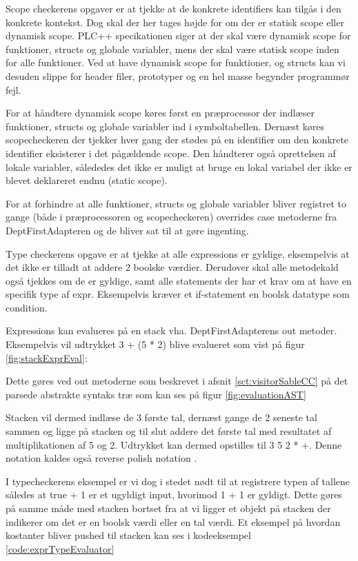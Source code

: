 Scope checkerens opgaver er at tjekke at de konkrete identifiers kan tilgås i den konkrete kontekst. Dog skal der her tages højde for om der er statisk scope eller dynamisk scope. PLC++ specikationen siger at der skal være dynamisk scope for funktioner, structs og globale variabler, mens der skal være statisk scope inden for alle funktioner. Ved at have dynamisk scope for funktioner, og structs kan vi desuden slippe for header filer, prototyper og en hel masse begynder programmør fejl.

For at håndtere dynamisk scope køres først en præprocessor der indlæser funktioner, structs og globale variabler ind i symboltabellen. Dernæst køres scopecheckeren der tjekker hver gang der stødes på en identifier om den konkrete identifier eksisterer i det pågældende scope. Den håndterer også oprettelsen af lokale variabler, sålededes det ikke er muligt at bruge en lokal variabel der ikke er blevet deklareret endnu (static scope).

For at forhindre at alle funktioner, structs og globale variabler bliver registret to gange (både i præprocessoren og scopecheckeren) overrides case metoderne fra DeptFirstAdapteren og de bliver sat til at gøre ingenting.

Type checkerens opgave er at tjekke at alle expressions er gyldige, eksempelvis at det ikke er tilladt at addere 2 boolske værdier. Derudover skal alle metodekald også tjekkes om de er gyldige, samt alle statements der har et krav om at have en specifik type af expr. Eksempelvis kræver et if-statement en boolsk datatype som condition.

Expressions kan evalueres på en stack vha. DeptFirstAdapterens out metoder. Eksempelvis vil udtrykket 3 + (5 * 2) blive evalueret som vist på figur \ref{fig:stackExprEval}:


Dette gøres ved out metoderne som beskrevet i afsnit \ref{sct:visitorSableCC} på det parsede abstrakte syntaks træ som kan ses på figur \ref{fig:evaluationAST}

Stacken vil dermed indlæse de 3 første tal, dernæst gange de 2 seneste tal sammen og ligge på stacken og til slut addere det første tal med resultatet af multiplikationen af 5 og 2. Udtrykket kan dermed opstilles til 3 5 2 * +. Denne notation kaldes også reverse polish notation \cite{CraftingCompiler_2009}.

I typecheckerens eksempel er vi dog i stedet nødt til at registrere typen af tallene således at true + 1 er et ugyldigt input, hvorimod 1 + 1 er gyldigt. Dette gøres på samme måde med stacken bortset fra at vi ligger et objekt på stacken der indikerer om det er en boolsk værdi eller en tal værdi. Et eksempel på hvordan kostanter bliver pushed til stacken kan ses i kodeeksempel \ref{code:exprTypeEvaluator}


